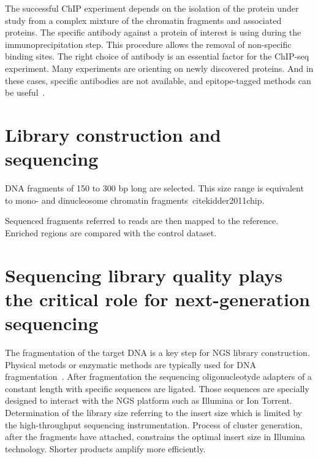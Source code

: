 The successful ChIP experiment depends on the isolation of the protein under study from a complex mixture of the chromatin fragments and associated proteins. 
The specific antibody against a protein of interest is using during the immunoprecipitation step. 
This procedure allows the removal of non-specific binding sites. 
The right choice of antibody is an essential factor for the ChIP-seq experiment. 
Many experiments are orienting on newly discovered proteins. 
And in these cases, specific antibodies are not available, and epitope-tagged methods can be useful~\cite{brizzard2008epitope, goldberg2010distinct}.

\section{Library construction and sequencing}

DNA fragments of 150 to 300 bp long are selected.
This size range is equivalent to mono- and dinucleosome chromatin fragments~cite{kidder2011chip}.



Sequenced fragments referred to reads are then mapped to the reference. 
Enriched regions are compared with the control dataset.











\section{Sequencing library quality plays the critical role for next-generation sequencing}
The fragmentation of the target DNA is a key step for NGS library construction.
Physical metods or enzymatic methods are typically used for DNA fragmentation~\cite{}.
After fragmentation the sequencing oligonucleotyde adapters of a constant length with specific sequences are ligated.
Those sequences are specially designed to interact with the NGS platform such as Illumina or Ion Torrent.
Determination of the library size referring to the insert size which is limited by the high-throughput sequencing instrumentation.
Process of cluster generation, after the fragments have attached, constrains the optimal insert size in Illumina technology.
Shorter products amplify more efficiently.

